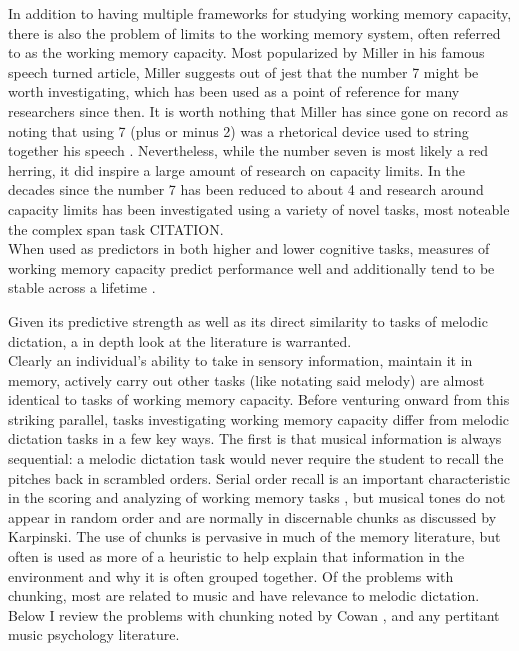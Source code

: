 \documentclass[]{book}
\begin{document}
In addition to having multiple frameworks for studying working memory capacity, there is also the problem of limits to the working memory system, often referred to as the working memory capacity.
Most popularized by Miller in his famous \citep{millerMagicalNumberSeven1956} speech turned article, Miller suggests out of jest that the number 7 might be worth investigating, which has been used as a point of reference for many researchers since then.
It is worth nothing that Miller has since gone on record as noting that using 7 (plus or minus 2) was a rhetorical device used to string together his speech \citep{millerHistoryPsychologyAutobiography1989}.
Nevertheless, while the number seven is most likely a red herring, it did inspire a large amount of research on capacity limits.
In the decades since the number 7 has been reduced to about 4 \citep{cowanMagicalMysteryFour2010} and research around capacity limits has been investigated using a variety of novel tasks, most noteable the complex span task CITATION.\\
When used as predictors in both higher and lower cognitive tasks, measures of working memory capacity predict performance well and additionally tend to be stable across a lifetime \citep{unsworthAutomatedVersionOperation2005}.

Given its predictive strength as well as its direct similarity to tasks of melodic dictation, a in depth look at the literature is warranted.\\
Clearly an individual's ability to take in sensory information, maintain it in memory, actively carry out other tasks (like notating said melody) are almost identical to tasks of working memory capacity.
Before venturing onward from this striking parallel, tasks investigating working memory capacity differ from melodic dictation tasks in a few key ways.
The first is that musical information is always sequential: a melodic dictation task would never require the student to recall the pitches back in scrambled orders.
Serial order recall is an important characteristic in the scoring and analyzing of working memory tasks \citep{conwayWorkingMemorySpan2005}, but musical tones do not appear in random order and are normally in discernable chunks as discussed by Karpinski\citep{karpinskiAuralSkillsAcquisition2000}.
The use of chunks is pervasive in much of the memory literature, but often is used as more of a heuristic to help explain that information in the environment and why it is often grouped together.
Of the problems with chunking, most are related to music and have relevance to melodic dictation.
Below I review the problems with chunking noted by Cowan \citep{cowanWorkingMemoryCapacity2005}, and any pertitant music psychology literature.
\end{document}
